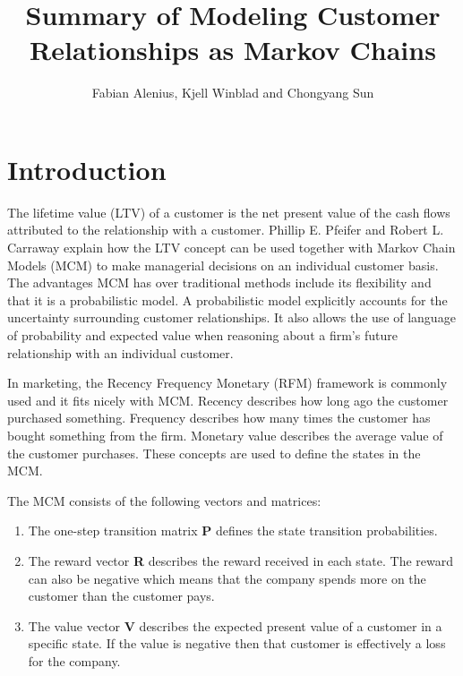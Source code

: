 \documentclass[11pt]{article}
\author{Fabian Alenius, Kjell Winblad and Chongyang Sun}
\title{Summary of Modeling Customer Relationships as Markov Chains}
\begin{document}
\maketitle


\section{Introduction}
The lifetime value (LTV) of a customer is the net present value of the cash flows attributed to the relationship with a customer.
Phillip E. Pfeifer and Robert L. Carraway \cite{customer} explain how the LTV concept can be used together with Markov Chain Models (MCM) to make managerial decisions on an individual customer basis. %
The advantages MCM has over traditional methods include its flexibility and that it is a probabilistic model.
A probabilistic model explicitly accounts for the uncertainty surrounding customer relationships.
It also allows the use of language of probability and expected value when reasoning about a firm's future relationship with an individual customer.

In marketing, the Recency Frequency Monetary (RFM) framework is commonly used and it fits nicely with MCM.
Recency describes how long ago the customer purchased something.
Frequency describes how many times the customer has bought something from the firm.
Monetary value describes the average value of the customer purchases.
These concepts are used to define the states in the MCM.

The MCM consists of the following vectors and matrices: 
\begin{enumerate}
\item The one-step transition matrix \textbf{P} defines the state transition probabilities.
\item The reward vector \textbf{R} describes the reward received in each state. The reward can also be negative which means that the company spends more on the customer than the customer pays.
\item The value vector \textbf{V} describes the expected present value of a customer in a specific state. If the value is negative then that customer is effectively a loss for the company.
\end{enumerate}
\end{document}
